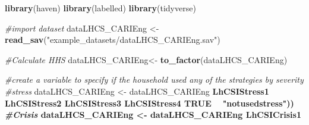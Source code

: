 \documentclass[
]{book}
\newenvironment{Shaded}{\begin{snugshade}}{\end{snugshade}}
\newcommand{\CommentTok}[1]{\textcolor[rgb]{0.56,0.35,0.01}{\textit{#1}}}
\newcommand{\DataTypeTok}[1]{\textcolor[rgb]{0.13,0.29,0.53}{#1}}
\newcommand{\KeywordTok}[1]{\textcolor[rgb]{0.13,0.29,0.53}{\textbf{#1}}}
\newcommand{\NormalTok}[1]{#1}
\newcommand{\OperatorTok}[1]{\textcolor[rgb]{0.81,0.36,0.00}{\textbf{#1}}}
\newcommand{\OtherTok}[1]{\textcolor[rgb]{0.56,0.35,0.01}{#1}}
\newcommand{\StringTok}[1]{\textcolor[rgb]{0.31,0.60,0.02}{#1}}
\begin{document}
\begin{Shaded}
\begin{Highlighting}[]
\KeywordTok{library}\NormalTok{(haven)}
\KeywordTok{library}\NormalTok{(labelled)}
\KeywordTok{library}\NormalTok{(tidyverse)}

\CommentTok{#import dataset}
\NormalTok{dataLHCS_CARIEng <-}\StringTok{ }\KeywordTok{read_sav}\NormalTok{(}\StringTok{"example_datasets/dataLHCS_CARIEng.sav"}\NormalTok{)}

\CommentTok{#Calculate HHS }
\NormalTok{dataLHCS_CARIEng<-}\StringTok{ }\KeywordTok{to_factor}\NormalTok{(dataLHCS_CARIEng)}

\CommentTok{#create a variable to specify if the household used any of the strategies by severity }
\CommentTok{#stress}
\NormalTok{dataLHCS_CARIEng <-}\StringTok{ }\NormalTok{dataLHCS_CARIEng }\OperatorTok{%>%}\StringTok{ }\KeywordTok{mutate}\NormalTok{(}\DataTypeTok{stress_coping =} \KeywordTok{case_when}\NormalTok{(}
\NormalTok{LhCSIStress1 }\OperatorTok{%in%}\StringTok{ }\KeywordTok{c}\NormalTok{(}\StringTok{"Yes"}\NormalTok{,}\StringTok{"No; because I already sold those assets or did this activity in the last 12 months and cannot continue to do it"}\NormalTok{) }\OperatorTok{~}\StringTok{ "usedstress"}\NormalTok{,}
\NormalTok{LhCSIStress2 }\OperatorTok{%in%}\StringTok{ }\KeywordTok{c}\NormalTok{(}\StringTok{"Yes"}\NormalTok{,}\StringTok{"No; because I already sold those assets or did this activity in the last 12 months and cannot continue to do it"}\NormalTok{) }\OperatorTok{~}\StringTok{ "usedstress"}\NormalTok{,}
\NormalTok{LhCSIStress3 }\OperatorTok{%in%}\StringTok{ }\KeywordTok{c}\NormalTok{(}\StringTok{"Yes"}\NormalTok{,}\StringTok{"No; because I already sold those assets or did this activity in the last 12 months and cannot continue to do it"}\NormalTok{) }\OperatorTok{~}\StringTok{ "usedstress"}\NormalTok{,}
\NormalTok{LhCSIStress4 }\OperatorTok{%in%}\StringTok{ }\KeywordTok{c}\NormalTok{(}\StringTok{"Yes"}\NormalTok{,}\StringTok{"No; because I already sold those assets or did this activity in the last 12 months and cannot continue to do it"}\NormalTok{) }\OperatorTok{~}\StringTok{ "usedstress"}\NormalTok{,}
\OtherTok{TRUE} \OperatorTok{~}\StringTok{ "notusedstress"}\NormalTok{))}
\CommentTok{#Crisis}
\NormalTok{dataLHCS_CARIEng <-}\StringTok{ }\NormalTok{dataLHCS_CARIEng }\OperatorTok{%>%}\StringTok{ }\KeywordTok{mutate}\NormalTok{(}\DataTypeTok{crisis_coping =} \KeywordTok{case_when}\NormalTok{(}
\NormalTok{LhCSICrisis1 }\OperatorTok{%in%}\StringTok{ }\KeywordTok{c}\NormalTok{(}\StringTok{"Yes"}\NormalTok{,}\StringTok{"No; because I already sold those assets or did this activity in the last 12 months and cannot continue to do it"}\NormalTok{) }\OperatorTok{~}\StringTok{ "usedcrisis"}\NormalTok{,}
}}}}}}}
\end{Highlighting}
\end{Shaded}
\end{document}
